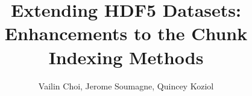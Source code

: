 \documentclass[10pt,first,firstsupp,handout]{THG_slides}
\begin{document}
\title{Extending HDF5 Datasets: Enhancements to the Chunk Indexing Methods}
\author{Vailin Choi, Jerome Soumagne, Quincey Koziol}

\begin{frame}
\maketitle
\end{frame}


\end{document}

